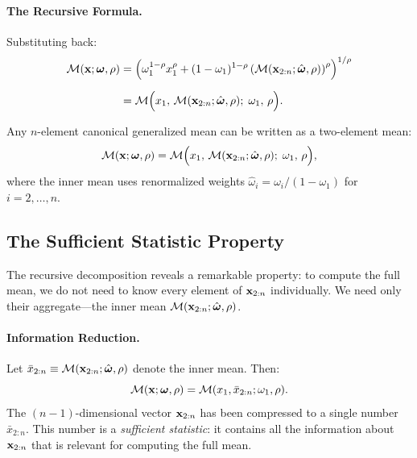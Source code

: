 \paragraph{The Recursive Formula.}
Substituting back:
\begin{align}
\mathcal{M}(\mathbf{x}; \boldsymbol{\omega}, \rho) &= \left( \omega_1^{1-\rho} x_1^\rho + (1-\omega_1)^{1-\rho} \left( \mathcal{M}(\mathbf{x}_{2:n}; \hat{\boldsymbol{\omega}}, \rho) \right)^\rho \right)^{1/\rho} \notag \\[6pt]
&= \mathcal{M}\Big( x_1, \, \mathcal{M}(\mathbf{x}_{2:n}; \hat{\boldsymbol{\omega}}, \rho); \; \omega_1, \, \rho \Big).
\label{eq:recursive-mean}
\end{align}

\begin{proposition}
\label{prop:recursive-decomposition}
Any $n$-element canonical generalized mean can be written as a two-element mean:
\begin{equation}
\mathcal{M}(\mathbf{x}; \boldsymbol{\omega}, \rho) = \mathcal{M}\Big( x_1, \, \mathcal{M}(\mathbf{x}_{2:n}; \hat{\boldsymbol{\omega}}, \rho); \; \omega_1, \, \rho \Big),
\end{equation}
where the inner mean uses renormalized weights $\hat{\omega}_i = \omega_i / (1 - \omega_1)$ for $i = 2, \ldots, n$.
\end{proposition}

\subsection{The Sufficient Statistic Property}
\label{subsec:sufficient-statistic}

The recursive decomposition reveals a remarkable property: to compute the full mean, we do not need to know every element of $\mathbf{x}_{2:n}$ individually. We need only their aggregate---the inner mean $\mathcal{M}(\mathbf{x}_{2:n}; \hat{\boldsymbol{\omega}}, \rho)$.

\paragraph{Information Reduction.}
Let $\bar{x}_{2:n} \equiv \mathcal{M}(\mathbf{x}_{2:n}; \hat{\boldsymbol{\omega}}, \rho)$ denote the inner mean. Then:
\begin{equation}
\mathcal{M}(\mathbf{x}; \boldsymbol{\omega}, \rho) = \mathcal{M}(x_1, \bar{x}_{2:n}; \omega_1, \rho).
\label{eq:information-reduction}
\end{equation}
The $(n-1)$-dimensional vector $\mathbf{x}_{2:n}$ has been compressed to a single number $\bar{x}_{2:n}$. This number is a \emph{sufficient statistic}: it contains all the information about $\mathbf{x}_{2:n}$ that is relevant for computing the full mean.

